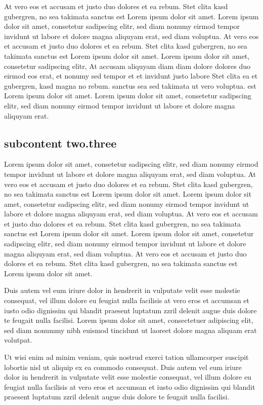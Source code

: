 At vero eos et accusam et justo duo dolores et ea rebum. Stet clita kasd
gubergren, no sea takimata sanctus est Lorem ipsum dolor sit amet. Lorem ipsum
dolor sit amet, consetetur sadipscing elitr, sed diam nonumy eirmod tempor
invidunt ut labore et dolore magna aliquyam erat, sed diam voluptua. At vero eos
et accusam et justo duo dolores et ea rebum. Stet clita kasd gubergren, no sea
takimata sanctus est Lorem ipsum dolor sit amet. Lorem ipsum dolor sit amet,
consetetur sadipscing elitr, At accusam aliquyam diam diam dolore dolores duo
eirmod eos erat, et nonumy sed tempor et et invidunt justo labore Stet clita ea
et gubergren, kasd magna no rebum. sanctus sea sed takimata ut vero voluptua.
est Lorem ipsum dolor sit amet. Lorem ipsum dolor sit amet, consetetur
sadipscing elitr, sed diam nonumy eirmod tempor invidunt ut labore et dolore
magna aliquyam erat.


 \subsection{subcontent two.three}   

Lorem ipsum dolor sit amet, consetetur sadipscing elitr, sed diam nonumy eirmod
tempor invidunt ut labore et dolore magna aliquyam erat, sed diam voluptua. At
vero eos et accusam et justo duo dolores et ea rebum. Stet clita kasd gubergren,
no sea takimata sanctus est Lorem ipsum dolor sit amet. Lorem ipsum dolor sit
amet, consetetur sadipscing elitr, sed diam nonumy eirmod tempor invidunt ut
labore et dolore magna aliquyam erat, sed diam voluptua. At vero eos et accusam
et justo duo dolores et ea rebum. Stet clita kasd gubergren, no sea takimata
sanctus est Lorem ipsum dolor sit amet. Lorem ipsum dolor sit amet, consetetur
sadipscing elitr, sed diam nonumy eirmod tempor invidunt ut labore et dolore
magna aliquyam erat, sed diam voluptua. At vero eos et accusam et justo duo
dolores et ea rebum. Stet clita kasd gubergren, no sea takimata sanctus est
Lorem ipsum dolor sit amet.

Duis autem vel eum iriure dolor in hendrerit in vulputate velit esse molestie
consequat, vel illum dolore eu feugiat nulla facilisis at vero eros et accumsan
et iusto odio dignissim qui blandit praesent luptatum zzril delenit augue duis
dolore te feugait nulla facilisi. Lorem ipsum dolor sit amet, consectetuer
adipiscing elit, sed diam nonummy nibh euismod tincidunt ut laoreet dolore magna
aliquam erat volutpat.

Ut wisi enim ad minim veniam, quis nostrud exerci tation ullamcorper suscipit
lobortis nisl ut aliquip ex ea commodo consequat. Duis autem vel eum iriure
dolor in hendrerit in vulputate velit esse molestie consequat, vel illum dolore
eu feugiat nulla facilisis at vero eros et accumsan et iusto odio dignissim qui
blandit praesent luptatum zzril delenit augue duis dolore te feugait nulla
facilisi.

